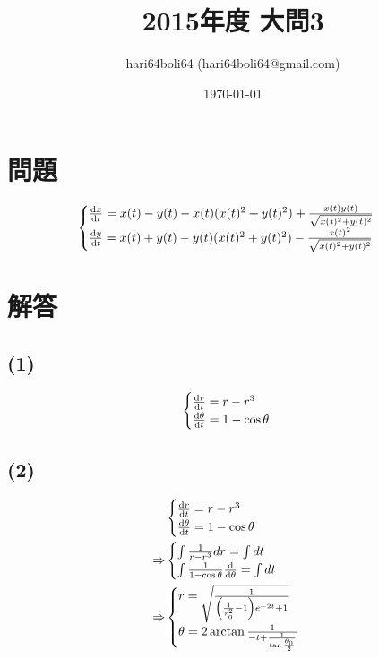 \documentclass[a4paper, 10pt, dvipdfmx]{jlreq}
\begin{document}
\title{2015年度 大問3}
\author{hari64boli64 (hari64boli64@gmail.com)}
\date{\today}
\maketitle

\section{問題}

\begin{align*}
  \begin{cases}
    \dv{x}{t}=x(t)-y(t)-x(t)(x(t)^2+y(t)^2)+\frac{x(t)y(t)}{\sqrt{x(t)^2+y(t)^2}} \\
    \dv{y}{t}=x(t)+y(t)-y(t)(x(t)^2+y(t)^2)-\frac{x(t)^2}{\sqrt{x(t)^2+y(t)^2}}   \\
  \end{cases}
\end{align*}

\section{解答}

\subsection*{(1)}

\begin{align*}
  \begin{cases}
    \dv{r}{t}=r-r^3 \\
    \dv{\theta}{t}=1-\cos{\theta}
  \end{cases}
\end{align*}

\subsection*{(2)}

\begin{align*}
              & \begin{cases}
                  \dv{r}{t}=r-r^3               \\
                  \dv{\theta}{t}=1-\cos{\theta} \\
                \end{cases}                                    \\
  \Rightarrow & \begin{cases}
                  \int \frac{1}{r-r^3} dr=\int dt                  \\
                  \int \frac{1}{1-\cos{\theta}}\dv{\theta}=\int dt \\
                \end{cases}       \\
  \Rightarrow & \begin{cases}
                  r=\sqrt{\frac{1}{\qty(\frac{1}{r_0^2}-1)e^{-2t}+1}}              \\
                  \theta=2\arctan{\frac{1}{-t+\frac{1}{\tan{\frac{\theta_0}{2}}}}} \\
                \end{cases}
\end{align*}
\end{document}
